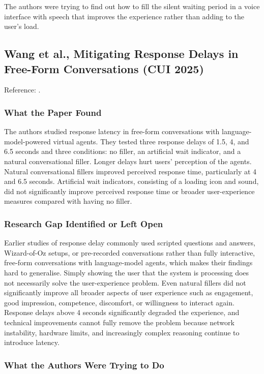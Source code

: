 \documentclass[11pt,a4paper]{report}
\begin{document}
The authors were trying to find out how to fill the silent waiting
period in a voice interface with speech that improves the experience
rather than adding to the user's load.

\subsection{Wang et al., Mitigating Response Delays in Free-Form
Conversations (CUI 2025)}

\noindent Reference: \autocite{fillers2025mitigating}.

\subsubsection{What the Paper Found}

The authors studied response latency in free-form conversations with
language-model-powered virtual agents. They tested three response
delays of 1.5, 4, and 6.5 seconds and three conditions: no filler, an
artificial wait indicator, and a natural conversational filler. Longer
delays hurt users' perception of the agents. Natural conversational
fillers improved perceived response time, particularly at 4 and 6.5
seconds. Artificial wait indicators, consisting of a loading icon and
sound, did not significantly improve perceived response time or broader
user-experience measures compared with having no filler.

\subsubsection{Research Gap Identified or Left Open}

Earlier studies of response delay commonly used scripted questions and
answers, Wizard-of-Oz setups, or pre-recorded conversations rather than
fully interactive, free-form conversations with language-model agents,
which makes their findings hard to generalise. Simply showing the user
that the system is processing does not necessarily solve the
user-experience problem. Even natural fillers did not significantly
improve all broader aspects of user experience such as engagement, good
impression, competence, discomfort, or willingness to interact again.
Response delays above 4 seconds significantly degraded the experience,
and technical improvements cannot fully remove the problem because
network instability, hardware limits, and increasingly complex
reasoning continue to introduce latency.

\subsubsection{What the Authors Were Trying to Do}
\end{document}
